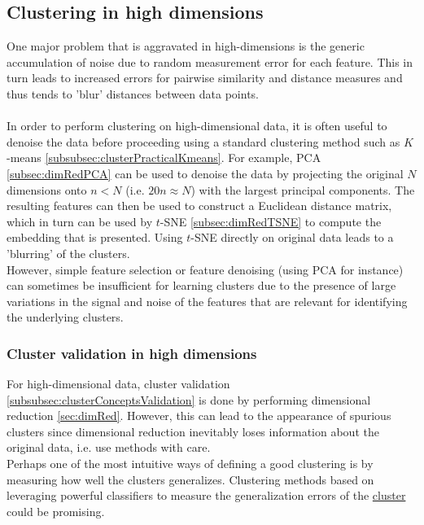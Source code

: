 \subsection{Clustering in high dimensions}
\label{subsec:clusterHighD}
One major problem that is aggravated in high-dimensions is the generic accumulation of noise due to random measurement error for each feature. This in turn leads to increased errors for pairwise similarity and distance measures and thus tends to ’blur’ distances between data points.\\
\\
In order to perform clustering on high-dimensional data, it is often useful to denoise the data before proceeding using a standard clustering method such as $K$-means \ref{subsubsec:clusterPracticalKmeans}. 
For example, PCA \ref{subsec:dimRedPCA} can be used to denoise the data by projecting the original $N$ dimensions onto $n < N$ (i.e. $20n\approx N$) with the largest principal components. The resulting features can then be used to construct a Euclidean distance matrix, which in turn can be used by $t$-SNE \ref{subsec:dimRedTSNE} to compute the embedding that is presented. Using $t$-SNE directly on original data leads to a ’blurring’ of the clusters.\\
However, simple feature selection or feature denoising (using PCA for instance) can sometimes be insufficient for learning clusters due to the presence of large variations in the signal and noise of the features that are relevant for identifying the underlying clusters.

\subsubsection{Cluster validation in high dimensions}
For high-dimensional data, cluster validation \ref{subsubsec:clusterConceptsValidation} is done by performing dimensional reduction \ref{sec:dimRed}. However, this can lead to the appearance of spurious clusters since dimensional reduction inevitably loses information about the original data, i.e. use methods with care.\\
Perhaps one of the most intuitive ways of defining a good clustering is by measuring how well the clusters generalizes. Clustering methods based on leveraging powerful classifiers to measure the generalization errors of the \href{https://pypi.org/project/hal-x/}{cluster} could be promising.









